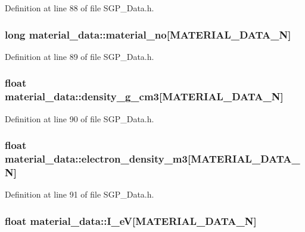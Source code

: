 Definition at line 88 of file SGP\_\-Data.h.\hypertarget{structmaterial__data_f70a3cdf7d0d845934a08cb14c8c6c38}{
\subsubsection[material\_\-no]{\setlength{\rightskip}{0pt plus 5cm}long {\bf material\_\-data::material\_\-no}\mbox{[}MATERIAL\_\-DATA\_\-N\mbox{]}}}
\label{de/d38/structmaterial__data_f70a3cdf7d0d845934a08cb14c8c6c38}




Definition at line 89 of file SGP\_\-Data.h.\hypertarget{structmaterial__data_4f64945234a21771d3bdfe43ca3dd059}{
\subsubsection[density\_\-g\_\-cm3]{\setlength{\rightskip}{0pt plus 5cm}float {\bf material\_\-data::density\_\-g\_\-cm3}\mbox{[}MATERIAL\_\-DATA\_\-N\mbox{]}}}
\label{de/d38/structmaterial__data_4f64945234a21771d3bdfe43ca3dd059}




Definition at line 90 of file SGP\_\-Data.h.\hypertarget{structmaterial__data_7757738688ad862124a2fbd07a8558f1}{
\subsubsection[electron\_\-density\_\-m3]{\setlength{\rightskip}{0pt plus 5cm}float {\bf material\_\-data::electron\_\-density\_\-m3}\mbox{[}MATERIAL\_\-DATA\_\-N\mbox{]}}}
\label{de/d38/structmaterial__data_7757738688ad862124a2fbd07a8558f1}




Definition at line 91 of file SGP\_\-Data.h.\hypertarget{structmaterial__data_fe47730c4df2973d45d16e49662f6a45}{
\subsubsection[I\_\-eV]{\setlength{\rightskip}{0pt plus 5cm}float {\bf material\_\-data::I\_\-eV}\mbox{[}MATERIAL\_\-DATA\_\-N\mbox{]}}}
\label{de/d38/structmaterial__data_fe47730c4df2973d45d16e49662f6a45}




